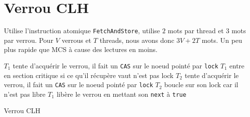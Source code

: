 \documentclass[11pt,a4paper]{report}
\begin{document}

\section{Verrou CLH} %
\label{sec:Verrou CLH}

Utilise l'instruction atomique \texttt{FetchAndStore}, utilise $2$ mots par thread et $3$ mots par verrou. Pour $V$ verrous et $T$ threads, nous avons donc $3V+2T$ mots. Un peu plus rapide que MCS à cause des lectures en moins.

\begin{algorithm}[h] %
    $T_1$ tente d'acquérir le verrou, il fait un \texttt{CAS} sur le noeud pointé par \texttt{lock}\;
    $T_1$ entre en section critique si ce qu'il récupère vaut n'est pas lock\;
    $T_2$ tente d'acquérir le verrou, il fait un \texttt{CAS} sur le noeud pointé par \texttt{lock}\;
    $T_2$ boucle sur son lock car il n'est pas libre\;
    $T_1$ libère le verrou en mettant son \texttt{next} à \texttt{true}\;
    \caption{Verrou CLH}
    \label{algo:verrou-clh}
\end{algorithm} %


\end{document}

